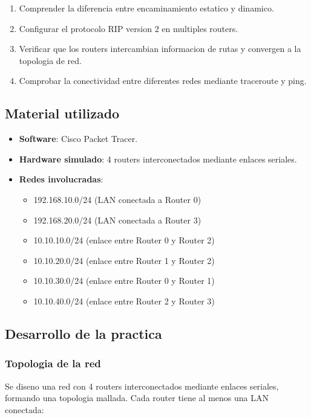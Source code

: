 \begin{enumerate}
    \item Comprender la diferencia entre encaminamiento estatico y dinamico.
    \item Configurar el protocolo RIP version 2 en multiples routers.
    \item Verificar que los routers intercambian informacion de rutas y convergen
    a la topologia de red.
    \item Comprobar la conectividad entre diferentes redes mediante traceroute y ping.
\end{enumerate}

\subsection{Material utilizado}

\begin{itemize}
    \item \textbf{Software}: Cisco Packet Tracer.
    \item \textbf{Hardware simulado}: 4 routers interconectados mediante enlaces seriales.
    \item \textbf{Redes involucradas}:
    \begin{itemize}
        \item 192.168.10.0/24 (LAN conectada a Router 0)
        \item 192.168.20.0/24 (LAN conectada a Router 3)
        \item 10.10.10.0/24 (enlace entre Router 0 y Router 2)
        \item 10.10.20.0/24 (enlace entre Router 1 y Router 2)
        \item 10.10.30.0/24 (enlace entre Router 0 y Router 1)
        \item 10.10.40.0/24 (enlace entre Router 2 y Router 3)
    \end{itemize}
\end{itemize}

\subsection{Desarrollo de la practica}

\subsubsection{Topologia de la red}

Se diseno una red con 4 routers interconectados mediante enlaces seriales,
formando una topologia mallada. Cada router tiene al menos una LAN conectada:

